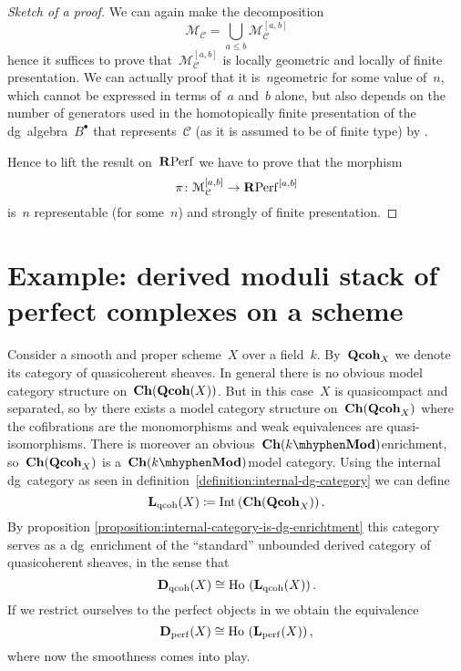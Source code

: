 \begin{refsection}
\begin{theorem}
  \begin{proof}[Sketch of a proof]
    We can again make the decomposition
    \begin{equation}
      \mathcal{M}_{\mathcal{C}}=\bigcup_{a\leq b}\mathcal{M}_{\mathcal{C}}^{[a,b]}
    \end{equation}
    hence it suffices to prove that~$\mathcal{M}_{\mathcal{C}}^{[a,b]}$ is locally geometric and locally of finite presentation. We can actually proof that it is~$n$\dash geometric for some value of~$n$, which cannot be expressed in terms of~$a$ and~$b$ alone, but also depends on the number of generators used in the homotopically finite presentation of the dg~algebra~$B^\bullet$ that represents~$\mathcal{C}$ (as it is assumed to be of finite type) by \cite[corollary 2.12]{toen-vaquie}.

    Hence to lift the result on~$\mathbf{R}\mathrm{Perf}$ we have to prove that the morphism
    \begin{equation}
      \pi\colon\mathcal{M}_{\mathcal{C}}^{[a,b]}\to\mathbf{R}\mathrm{Perf}^{[a,b]}
    \end{equation}
    is~$n$ representable (for some~$n$) and strongly of finite presentation.
  \end{proof}
\end{theorem}

\section{Example: derived moduli stack of perfect complexes on a scheme}
\label{section:example}
Consider a smooth and proper scheme~$X$ over a field~$k$. By~$\mathbf{Qcoh}_X$ we denote its category of quasicoherent sheaves. In general there is no obvious model category structure on~$\mathbf{Ch}(\mathbf{Qcoh}(X))$. But in this case~$X$ is quasicompact and separated, so by \cite{hovey-sheaves} there exists a model category structure on~$\mathbf{Ch}(\mathbf{Qcoh}_X)$ where the cofibrations are the monomorphisms and weak equivalences are quasi-isomorphisms. There is moreover an obvious~$\Ch(k\mhyphen\Mod)$\dash enrichment, so~$\mathbf{Ch}(\mathbf{Qcoh}_X)$ is a~$\Ch(k\mhyphen\Mod)$\dash model category. Using the internal dg~category as seen in definition~\ref{definition:internal-dg-category} we can define
\begin{equation}
  \mathbf{L}_{\mathrm{qcoh}}(X)\coloneqq\operatorname{Int}\left( \mathbf{Ch}(\mathbf{Qcoh}_X) \right).
\end{equation}
By proposition \ref{proposition:internal-category-is-dg-enrichtment} this category serves as a dg~enrichment of the ``standard'' unbounded derived category of quasicoherent sheaves, in the sense that
\begin{equation}
  \mathbf{D}_{\mathrm{qcoh}}(X)\cong\operatorname{\mathrm{Ho} \,}\left( \mathbf{L}_{\mathrm{qcoh}}(X) \right).
\end{equation}
If we restrict ourselves to the perfect objects in we obtain the equivalence
\begin{equation}
  \mathbf{D}_{\mathrm{perf}}(X)\cong\operatorname{\mathrm{Ho} \,}\left( \mathbf{L}_{\mathrm{perf}}(X) \right),
\end{equation}
where now the smoothness comes into play.


\end{refsection}
